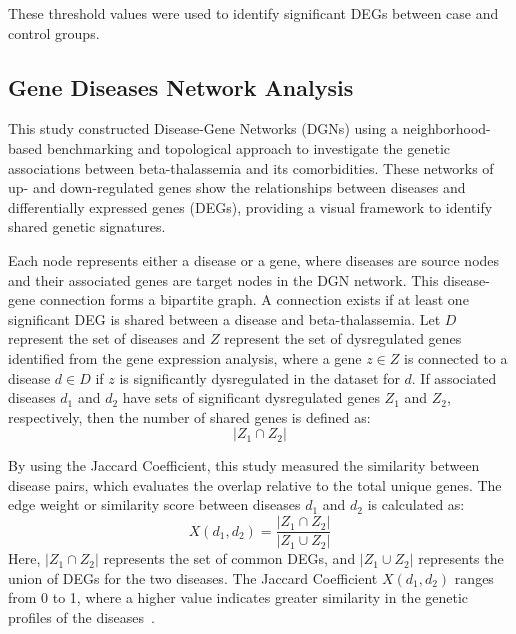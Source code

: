 These threshold values were used to identify significant DEGs between case and control groups.

\vspace*{-\parskip} %
\subsection{Gene Diseases Network Analysis}
\label{sec:sec3_4_3}

This study constructed Disease-Gene Networks (DGNs) using a neighborhood-based benchmarking and topological approach to investigate the genetic associations between beta-thalassemia and its comorbidities. These networks of up- and down-regulated genes show the relationships between diseases and differentially expressed genes (DEGs), providing a visual framework to identify shared genetic signatures.

Each node represents either a disease or a gene, where diseases are source nodes and their associated genes are target nodes in the DGN network. This disease-gene connection forms a bipartite graph. A connection exists if at least one significant DEG is shared between a disease and beta-thalassemia. Let \(D\) represent the set of diseases and \(Z\) represent the set of dysregulated genes identified from the gene expression analysis, where a gene \(z \in Z\) is connected to a disease \(d \in D\) if \(z\) is significantly dysregulated in the dataset for \(d\). If associated diseases \(d_1\) and \(d_2\) have sets of significant dysregulated genes \(Z_1\) and \(Z_2\), respectively, then the number of shared genes is defined as:
\begin{equation}
|Z_1 \cap Z_2|
\label{eq:shared_genes}
\end{equation}

By using the Jaccard Coefficient, this study measured the similarity between disease pairs, which evaluates the overlap relative to the total unique genes. The edge weight or similarity score between diseases \(d_1\) and \(d_2\) is calculated as:
\begin{equation}
X(d_1, d_2) = \frac{|Z_1 \cap Z_2|}{|Z_1 \cup Z_2|}
\label{eq:jaccard}
\end{equation}
Here, \(|Z_1 \cap Z_2|\) represents the set of common DEGs, and \(|Z_1 \cup Z_2|\) represents the union of DEGs for the two diseases. The Jaccard Coefficient \(X(d_1, d_2)\) ranges from 0 to 1, where a higher value indicates greater similarity in the genetic profiles of the diseases~\cite{b20}.

